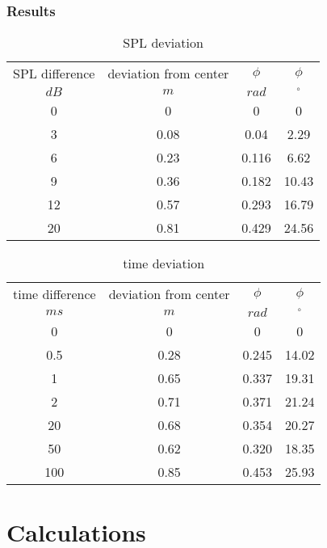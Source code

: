 \documentclass{article}
\begin{document}
\subsubsection{Results}

\begin{table}
\begin{center}
\begin{tabular}{|c||c||c|c|}
\hline
SPL difference & deviation from center & $\phi$ & $\phi$ \\
$dB$	&	$m$	&	$rad$	&	$^\circ$		\\
\hline
\hline
0 & 0 & 0 & 0\\
\hline
3 & 0.08 & 0.04 & 2.29 \\
\hline
6 & 0.23 & 0.116 & 6.62\\
\hline
9 & 0.36 & 0.182 & 10.43\\
\hline
12 & 0.57 & 0.293 & 16.79\\
\hline
20 & 0.81 & 0.429 & 24.56\\
\hline
\end{tabular}
\caption{SPL deviation}
\label{tab:SPL}
\end{center}
\end{table}

\begin{table}
\begin{center}
\begin{tabular}{|c||c||c|c|}
\hline
time difference & deviation from center & $\phi$ & $\phi$ \\
$ms$	&	$m$	&	$rad$	&	$^\circ$		\\
\hline
\hline
0 & 0 & 0 & 0\\
\hline
0.5 & 0.28 & 0.245 & 14.02\\
\hline
1 & 0.65 & 0.337 & 19.31\\
\hline
2 & 0.71 & 0.371 & 21.24\\
\hline
20 & 0.68 & 0.354 & 20.27\\
\hline
50 & 0.62 & 0.320 & 18.35\\
\hline
100 & 0.85 & 0.453 & 25.93\\
\hline
\end{tabular}
\caption{time deviation}
\label{tab:time}
\end{center}
\end{table}

\section{Calculations}
\end{document}

